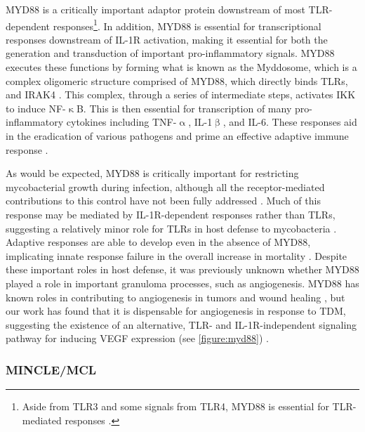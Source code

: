 MYD88 is a critically important adaptor protein downstream of most TLR\hyp{}dependent responses\footnote{Aside from TLR3 and some signals from TLR4, MYD88 is essential for TLR\hyp{}mediated responses \citep{Takeda2004, Kawasaki2014}.}. In addition, MYD88 is essential for transcriptional responses downstream of IL\hyp{}1R activation, making it essential for both the generation and transduction of important pro\hyp{}inflammatory signals. MYD88 executes these functions by forming what is known as the Myddosome, which is a complex oligomeric structure comprised of MYD88, which directly binds TLRs, and IRAK4 \citep{Latty2018}. This complex, through a series of intermediate steps, activates IKK to induce NF\hyp{}$\upkappa$B. This is then essential for transcription of many pro\hyp{}inflammatory cytokines including TNF\hyp{}$\upalpha$, IL\hyp{}1$\upbeta$, and IL\hyp{}6. These responses aid in the eradication of various pathogens and prime an effective adaptive immune response \citep{Balka2019}. 

As would be expected, MYD88 is critically important for restricting mycobacterial growth during infection, although all the receptor\hyp{}mediated contributions to this control have not been fully addressed \citep{Berod2014, Shi2003, Scanga2004, Holscher2008, Sugawara2003, Cervantes2017, Underhill1999, Hosseini2021}. Much of this response may be mediated by IL\hyp{}1R\hyp{}dependent responses rather than TLRs, suggesting a relatively minor role for TLRs in host defense to mycobacteria \citep{Fremond2007, Holscher2008, Cambier2014b}. Adaptive responses are able to develop even in the absence of MYD88, implicating innate response failure in the overall increase in mortality \citep{Fremond2004}. Despite these important roles in host defense, it was previously unknown whether MYD88 played a role in important granuloma processes, such as angiogenesis. MYD88 has known roles in contributing to angiogenesis in tumors and wound healing \citep{Macedo2007, Zhang2020b}, but our work has found that it is dispensable for angiogenesis in response to TDM, suggesting the existence of an alternative, TLR\hyp{} and IL\hyp{}1R\hyp{}independent signaling pathway for inducing VEGF expression (see \autoref{figure:myd88}) \citep{Walton2018}.

\subsubsection{MINCLE/MCL}


